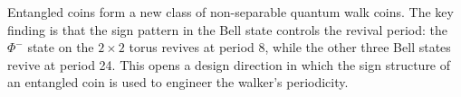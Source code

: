 Entangled coins form a new class of non-separable quantum walk coins.
The key finding is that the sign pattern in the Bell state controls the
revival period: the $\Phi^-$ state on the $2 \times 2$ torus revives at
period 8, while the other three Bell states revive at period 24. This
opens a design direction in which the sign structure of an entangled
coin is used to engineer the walker's periodicity.
